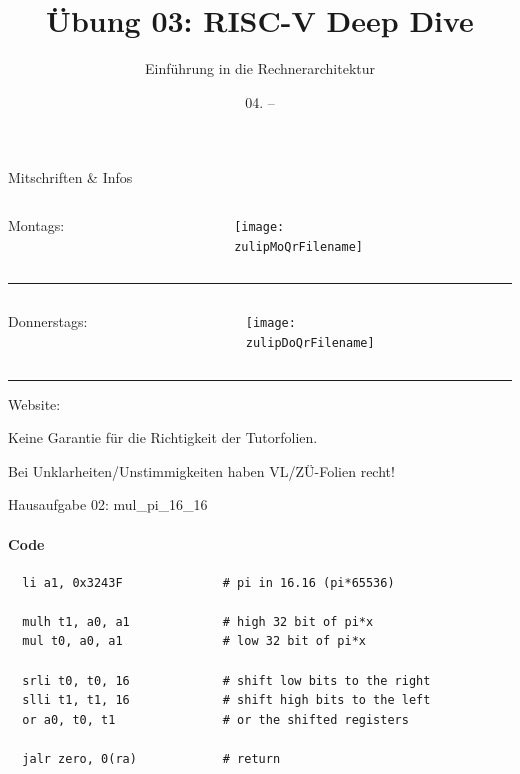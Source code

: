 \documentclass[
  german,            %
  aspectratio=169,    %
]{tumbeamer}
\title{Übung 03: RISC-V Deep Dive}
\subtitle{Einführung in die Rechnerarchitektur}
\author{\theAuthorName}
\institute{\theGroupName\\\theSchoolName\\\theUniversityName}
\date{04. -- \DTMdisplaydate{2024}{11}{10}{-1}}
\begin{document}
\maketitle

\begin{frame}[c]{Mitschriften \& Infos}{}
  \begin{minipage}[t]{\textwidth}
    \begin{columns}[c]
      \begin{column}{0.8\textwidth}
        Montags: \href{\zulipMo}{\zulipMo}
      \end{column}
      \begin{column}{0.2\textwidth}
        \texttt{[image: \\zulipMoQrFilename]}
      \end{column}
    \end{columns}
  \end{minipage}
  \rule{\textwidth}{0.4pt}
  \begin{minipage}[t]{\textwidth}
    \begin{columns}[c]
      \begin{column}{0.8\textwidth}
        Donnerstags: \href{\zulipDo}{\zulipDo}
      \end{column}
      \begin{column}{0.2\textwidth}
        \texttt{[image: \\zulipDoQrFilename]}
      \end{column}
    \end{columns}
  \end{minipage}
  \ifdefined\myWebsite
  \rule{\textwidth}{0.4pt}
  \centering
  Website: \href{\myWebsite}{\myWebsite}
  \fi
\end{frame}

\begin{frame}[c]{}{}
  \begin{center}
    \LARGE  Keine Garantie für die Richtigkeit der Tutorfolien.

    \Large Bei Unklarheiten/Unstimmigkeiten haben VL/ZÜ-Folien recht!
  \end{center}
\end{frame}

\begin{frame}[fragile]{Hausaufgabe 02: mul\_pi\_16\_16}
  \framesubtitle{Code}
  \begin{lstlisting}
  li a1, 0x3243F              # pi in 16.16 (pi*65536)
  
  mulh t1, a0, a1             # high 32 bit of pi*x
  mul t0, a0, a1              # low 32 bit of pi*x
  
  srli t0, t0, 16             # shift low bits to the right
  slli t1, t1, 16             # shift high bits to the left
  or a0, t0, t1               # or the shifted registers
  
  jalr zero, 0(ra)            # return
  \end{lstlisting}
\end{frame}
  
\end{document}
